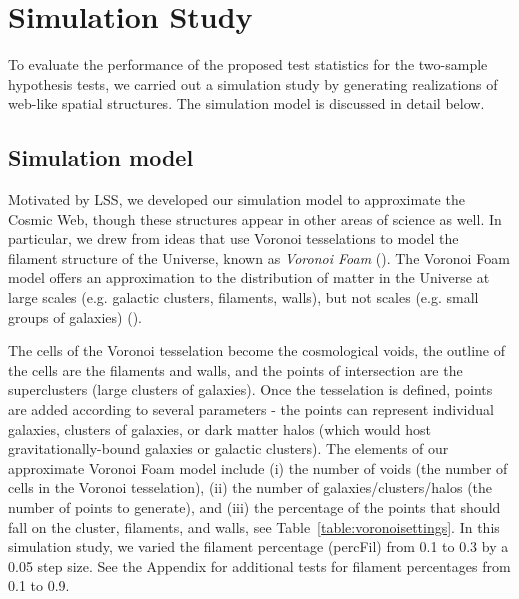 \documentclass[12pt]{article}
\begin{document}

\section{Simulation Study}
\label{sec:simulation}

To evaluate the performance of the proposed test statistics for the two-sample hypothesis tests, we carried out a simulation study by generating realizations of web-like spatial structures.  The simulation model is discussed in detail below. 

\subsection{Simulation model} \label{sec:sim_model} %
Motivated by LSS, we developed our simulation model to approximate the Cosmic Web, though these structures appear in other areas of science as well.  In particular, we drew from ideas that use Voronoi tesselations to model the filament structure of the Universe, known as \emph{Voronoi Foam} (\cite{icke1987fragmenting, icke1991galaxy, van2007voronoi}).  The Voronoi Foam model offers an approximation to the distribution of matter in the Universe at large scales (e.g. galactic clusters, filaments, walls), but not scales (e.g. small groups of galaxies) (\cite{icke1991galaxy}).

The cells of the Voronoi tesselation become the cosmological voids, the outline of the cells are the filaments and walls, and the points of intersection are the superclusters (large clusters of galaxies).  Once the tesselation is defined, points are added according to several parameters - the points can represent individual galaxies, clusters of galaxies, or dark matter halos (which would host gravitationally-bound galaxies or galactic clusters).
The elements of our approximate Voronoi Foam model include (i) the number of voids (the number of cells in the Voronoi tesselation), (ii) the number of galaxies/clusters/halos (the number of points to generate), and (iii) the percentage of the points that should fall on the cluster, filaments, and walls, see Table~\ref{table:voronoisettings}. In this simulation study, we varied the filament percentage (percFil) from 0.1 to 0.3 by a 0.05 step size. See the Appendix for additional tests for filament percentages from 0.1 to 0.9.
\end{document}
